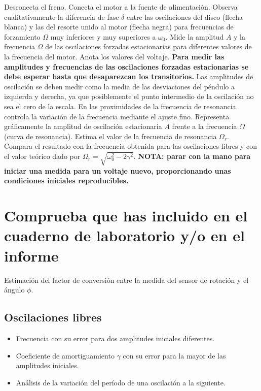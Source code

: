 \documentclass[11pt]{articulo}
\begin{document}
Desconecta el freno. Conecta el motor a la fuente de alimentaci\'on. Observa cualitativamente la diferencia de fase $\delta$ entre las oscilaciones del disco (flecha blanca) y las del resorte unido al motor (flecha negra) para frecuencias de forzamiento $\Omega$ muy inferiores y muy superiores a $\omega_0$. Mide la amplitud $A$ y la frecuencia $\Omega$ de las oscilaciones forzadas estacionarias para diferentes valores de la frecuencia del motor. Anota los valores del voltaje. {\bf Para medir las amplitudes y frecuencias de las oscilaciones forzadas estacionarias se debe esperar hasta que desaparezcan los transitorios.} Las amplitudes de oscilaci\'on se deben medir como la media de las desviaciones del p\'endulo a izquierda y derecha, ya que posiblemente el punto intermedio de la oscilaci\'on no sea el cero de la escala. En las proximidades de la frecuencia de resonancia controla la variaci\'on de la frecuencia mediante el ajuste fino. Representa gr\'aficamente la amplitud de oscilaci\'on estacionaria $A$ frente a la frecuencia $\Omega$ (curva de resonancia). Estima el valor de la frecuencia de resonancia $\Omega_r$. Compara el resultado con la frecuencia obtenida para las oscilaciones libres y con el valor te\'orico dado por $\Omega_r = \sqrt{\omega_0^2 - 2\gamma^2}$. {\bf NOTA: parar con la mano para iniciar una medida para un voltaje nuevo, proporcionando unas condiciones iniciales reproducibles.}


\section{Comprueba que has incluido en el cuaderno de laboratorio y/o en el informe}

Estimaci\'on del factor de conversi\'on entre la medida del sensor de rotaci\'on y el \'angulo $\phi$.

\subsection*{Oscilaciones libres}

\begin{itemize}

\item{Frecuencia con su error para dos amplitudes iniciales diferentes.}
\item{Coeficiente de amortiguamiento $\gamma$ con su error para la mayor de las amplitudes iniciales.}
\item{An\'alisis de la variaci\'on del per\'iodo de una oscilaci\'on a la siguiente.}

\end{itemize}
\end{document}
